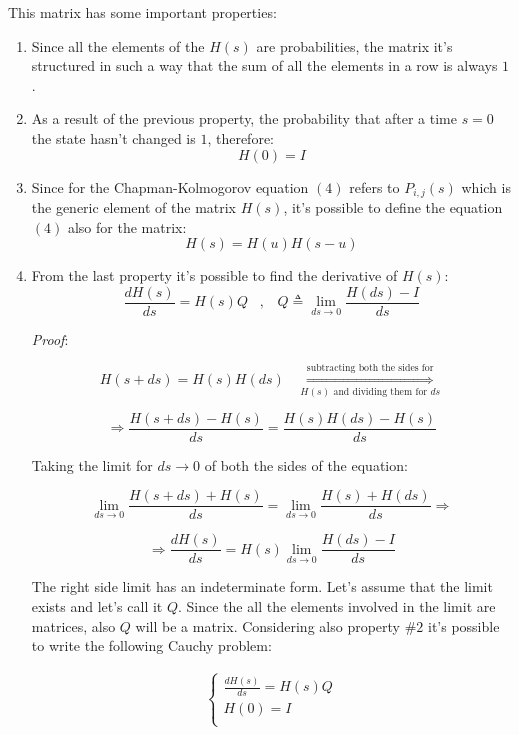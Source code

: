 \documentclass[12pt,a4paper]{article}
\begin{document}
\bigskip\noindent
This matrix has some important properties:
\begin{enumerate}
\item Since all the elements of the $H(s)$ are probabilities, the matrix it's structured in such a way that the sum of all the elements in a row is always $1$.
\item As a result of the previous property, the probability that after a time $s=0$ the state hasn't changed is $1$, therefore:
$$
H(0)=I
$$
\item Since for the Chapman-Kolmogorov equation $(4)$ refers to $P_{i,j}(s)$ which is the generic element of the matrix $H(s)$, it's possible to define the equation $(4)$ also for the matrix:
$$
H(s)=H(u)H(s-u)
$$
\newpage
\item From the last property it's possible to find the derivative of $H(s)$:
$$
\frac{dH(s)}{ds}=H(s)Q\hspace{10pt},\hspace{10pt}Q\triangleq\lim_{ds\rightarrow 0}\frac{H(ds)-I}{ds}
$$

\noindent
\emph{Proof}:

$$
H(s+ds)=H(s)H(ds)\hspace{10pt}\overset{\textrm{subtracting both the sides for}}
{\underset{H(s) \textrm{ and dividing them for }ds}{\Rightarrow}}
$$

\medskip
$$
\Rightarrow
\frac{H(s+ds)-H(s)}{ds}=\frac{H(s)H(ds)-H(s)}{ds}
$$

\medskip
Taking the limit for $ds\rightarrow 0$ of both the sides of the equation:

$$
\lim_{ds\rightarrow 0}{\frac{H(s+ds)+H(s)}{ds}}=
\lim_{ds\rightarrow 0}{\frac{H(s)+H(ds)}{ds}} \Rightarrow
$$

\medskip
$$
\Rightarrow
\frac{dH(s)}{ds}=H(s)\lim_{ds\rightarrow 0}{\frac{H(ds)-I}{ds}}
$$

\medskip
The right side limit has an indeterminate form. Let's assume that the limit exists and let's call it $Q$. Since the all the elements involved in the limit are matrices, also $Q$ will be a matrix. Considering also property $\#2$ it's possible to write the following Cauchy problem:

\begin{Large}
$$
\begin{matrix}
\begin{cases}
\frac{dH(s)}{ds}=H(s)Q\\
H(0)=I \\
\end{cases}
\end{matrix}
$$
\end{Large}


\end{enumerate}
\end{document}
